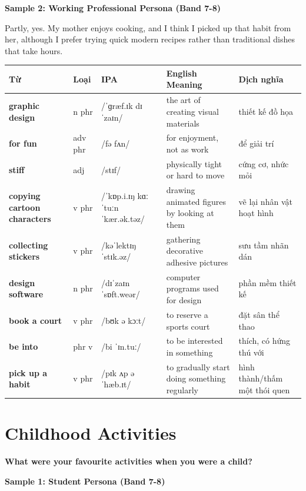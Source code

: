 \textbf{Sample 2: Working Professional Persona (Band 7-8)}

Partly, yes. My mother enjoys cooking, and I think I picked up that habit from her, although I prefer trying quick modern recipes rather than traditional dishes that take hours.

\separator


\vspace{0.8em}
\begin{center}
\renewcommand{\arraystretch}{1.65}
\begin{tabularx}{\textwidth}{|V{0.22\textwidth}|C{0.07\textwidth}|I{0.20\textwidth}|Y|V{0.18\textwidth}|}
\hline
{}
\textbf{Từ} & \textbf{Loại} & \textbf{IPA} & \textbf{English Meaning} & \textbf{Dịch nghĩa} \\
\hline
\textbf{graphic design} & n phr & /ˈɡræf.ɪk dɪˈzaɪn/ & the art of creating visual materials & thiết kế đồ họa \\ \hline
\textbf{for fun} & adv phr & /fə fʌn/ & for enjoyment, not as work & để giải trí \\ \hline
\textbf{stiff} & adj & /stɪf/ & physically tight or hard to move & cứng cơ, nhức mỏi \\ \hline
\textbf{copying cartoon characters} & v phr & /ˈkɒp.i.ɪŋ kɑːˈtuːn ˈkær.ək.təz/ & drawing animated figures by looking at them & vẽ lại nhân vật hoạt hình \\ \hline
\textbf{collecting stickers} & v phr & /kəˈlektɪŋ ˈstɪk.əz/ & gathering decorative adhesive pictures & sưu tầm nhãn dán \\ \hline
\textbf{design software} & n phr & /dɪˈzaɪn ˈsɒft.weər/ & computer programs used for design & phần mềm thiết kế \\ \hline
\textbf{book a court} & v phr & /bʊk ə kɔːt/ & to reserve a sports court & đặt sân thể thao \\ \hline
\textbf{be into} & phr v & /bi ˈɪn.tuː/ & to be interested in something & thích, có hứng thú với \\ \hline
\textbf{pick up a habit} & v phr & /pɪk ʌp ə ˈhæb.ɪt/ & to gradually start doing something regularly & hình thành/thấm một thói quen \\ \hline
\end{tabularx}
\end{center}

\newpage

\section{Childhood Activities}
\begin{ieltsquestion}
\textbf{What were your favourite activities when you were a child?}
\end{ieltsquestion}
\textbf{Sample 1: Student Persona (Band 7-8)}

